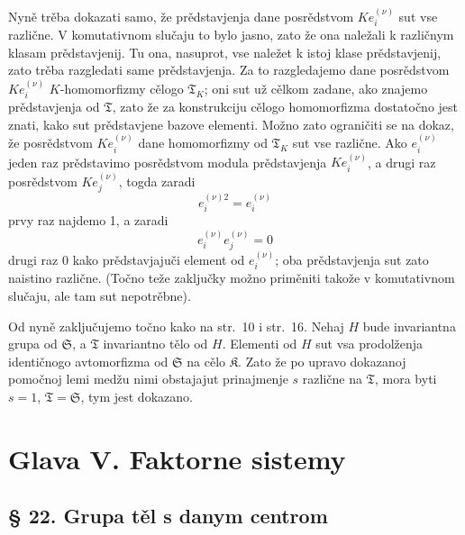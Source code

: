 \documentclass[11pt]{article}
\begin{document}
Nyně trěba dokazati samo, že prědstavjenja dane posrědstvom \(K e_i^{(\nu)}\) sut vse različne. V komutativnom slučaju to bylo jasno, zato že ona naležali k različnym klasam prědstavjenij. Tu ona, nasuprot, vse naležet k istoj klase prědstavjenij, zato trěba razgledati same prědstavjenja. Za to razgledajemo dane posrědstvom \(K e_i^{(\nu)}\) \(K\)-homomorfizmy cělogo \(\mathfrak T_K\); oni sut už cělkom zadane, ako znajemo prědstavjenja od \(\mathfrak T\), zato že za konstrukciju cělogo homomorfizma dostatočno jest znati, kako sut prědstavjene bazove elementi. Možno zato ograničiti se na dokaz, že posrědstvom \(K e_i^{(\nu)}\) dane homomorfizmy od \(\mathfrak T_K\) sut vse različne. Ako \(e_i^{(\nu)}\) jeden raz prědstavimo posrědstvom modula prědstavjenja \(K e_i^{(\nu)}\), a drugi raz posrědstvom \(K e_j^{(\nu)}\), togda zaradi
\[
e_i^{(\nu)2}=e_i^{(\nu)}
\]
prvy raz najdemo 1, a zaradi
\[
e_i^{(\nu)}e_j^{(\nu)}=0
\]
drugi raz 0 kako prědstavjajuči element od \(e_i^{(\nu)}\); oba prědstavjenja sut zato naistino različne. (Točno teže zaključky možno priměniti takože v komutativnom slučaju, ale tam sut nepotrěbne).

Od nyně zaključujemo točno kako na str.~10 i str.~16. Nehaj \(H\) bude invariantna grupa od \(\mathfrak S\), a \(\mathfrak T\) invariantno tělo od \(H\). Elementi od \(H\) sut vsa prodolženja identičnogo avtomorfizma od \(\mathfrak S\) na cělo \(\mathfrak K\). Zato že po upravo dokazanoj pomočnoj lemi medžu nimi obstajajut prinajmenje \(s\) različne na \(\mathfrak T\), mora byti \(s=1\), \(\mathfrak T=\mathfrak S\), tym jest dokazano.

\section*{Glava V. Faktorne sistemy}\label{kapitel-v.-faktorensysteme}

\subsection*{§ 22. Grupa těl s danym centrom}\label{die-gruppe-der-koerper-mit-gegebenem-zentrum}
\end{document}
